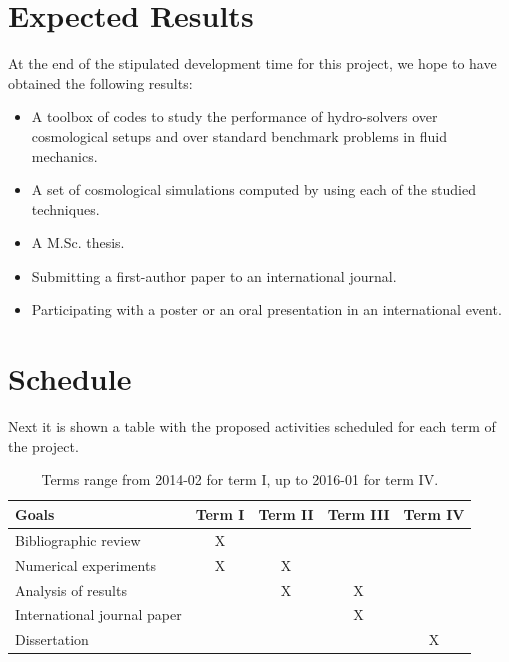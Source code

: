 \documentclass[a4,useAMS,usenatbib,usegraphicx,12pt]{article}
\begin{document}
\section{Expected Results}
At the end of the stipulated development time for this project, we hope to have
obtained the following results:
\begin{itemize}
\item A toolbox of codes to study the performance of hydro-solvers over 
cosmological setups and over standard benchmark problems in fluid mechanics.
\item A set of cosmological simulations computed by using each of the studied
techniques.
\item A M.Sc. thesis.
\item Submitting a first-author paper to an international journal.
\item Participating with a poster or an oral presentation in an international
event.
\end{itemize}


\section{Schedule}
Next it is shown a table with the proposed activities scheduled for each term
of the project.

\begin{table}[h]
\begin{flushleft}
\begin{center}
  \begin{tabular}{l  c c c c } \hline\hline
	\centering\textbf{Goals} & \textbf{Term I} & \textbf{Term II} & 
	\textbf{Term III} & \textbf{Term IV} \\ \hline\hline
	
	 Bibliographic review & X & & & \\
	 Numerical experiments & X & X & & \\
	 Analysis of results &  & X & X & \\
	 International journal paper &  &  & X & \\
	 Dissertation &  &  &  & X \\
	\hline\hline
  \end{tabular}  
  \caption{ Terms range from 2014-02 for term I, up to 2016-01 for term IV.}
\end{center}
\end{flushleft}
\end{table}



\renewcommand{\bibname}{8\ \ \ \ Bibliography}
\small

\end{document}
